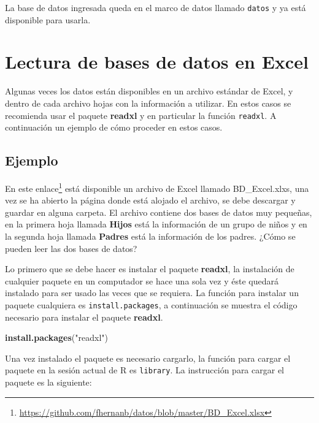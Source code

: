 \documentclass[10pt,]{krantz}
\makeatletter
\newenvironment{Shaded}{\begin{snugshade}}{\end{snugshade}}
\newcommand{\KeywordTok}[1]{\textcolor[rgb]{0.13,0.29,0.53}{\textbf{#1}}}
\newcommand{\StringTok}[1]{\textcolor[rgb]{0.31,0.60,0.02}{#1}}
\newcommand{\NormalTok}[1]{#1}
\renewcommand{\href}[2]{#2\footnote{\url{#1}}}
\newenvironment{kframe}{%
\medskip{}
\setlength{\fboxsep}{.8em}
 \def\at@end@of@kframe{}%
 \ifinner\ifhmode%
  \def\at@end@of@kframe{\end{minipage}}%
  \begin{minipage}{\columnwidth}%
 \fi\fi%
 \def\FrameCommand##1{\hskip\@totalleftmargin \hskip-\fboxsep
 \colorbox{shadecolor}{##1}\hskip-\fboxsep
     \hskip-\linewidth \hskip-\@totalleftmargin \hskip\columnwidth}%
 \MakeFramed {\advance\hsize-\width
   \@totalleftmargin\z@ \linewidth\hsize
   \@setminipage}}%
 {\par\unskip\endMakeFramed%
 \at@end@of@kframe}
\renewenvironment{Shaded}{\begin{kframe}}{\end{kframe}}
\makeatother
\begin{document}
La base de datos ingresada queda en el marco de datos llamado
\texttt{datos} y ya está disponible para usarla.

\section{Lectura de bases de datos en
Excel}\label{lectura-de-bases-de-datos-en-excel}

Algunas veces los datos están disponibles en un archivo estándar de
Excel, y dentro de cada archivo hojas con la información a utilizar. En
estos casos se recomienda usar el paquete \textbf{readxl}
\citep{R-readxl} y en particular la función \texttt{readxl}. A
continuación un ejemplo de cómo proceder en estos casos.

\subsection*{Ejemplo}\label{ejemplo-26}


En este
\href{https://github.com/fhernanb/datos/blob/master/BD_Excel.xlsx}{enlace}
está disponible un archivo de Excel llamado BD\_Excel.xlxs, una vez se
ha abierto la página donde está alojado el archivo, se debe descargar y
guardar en alguna carpeta. El archivo contiene dos bases de datos muy
pequeñas, en la primera hoja llamada \textbf{Hijos} está la información
de un grupo de niños y en la segunda hoja llamada \textbf{Padres} está
la información de los padres. ¿Cómo se pueden leer las dos bases de
datos?

Lo primero que se debe hacer es instalar el paquete \textbf{readxl}, la
instalación de cualquier paquete en un computador se hace una sola vez y
éste quedará instalado para ser usado las veces que se requiera. La
función para instalar un paquete cualquiera es
\texttt{install.packages}, a continuación se muestra el código necesario
para instalar el paquete \textbf{readxl}.

\begin{Shaded}
\begin{Highlighting}[]
\KeywordTok{install.packages}\NormalTok{(}\StringTok{"readxl"}\NormalTok{)}
\end{Highlighting}
\end{Shaded}

Una vez instalado el paquete es necesario cargarlo, la función para
cargar el paquete en la sesión actual de R es \texttt{library}. La
instrucción para cargar el paquete es la siguiente:
\end{document}
